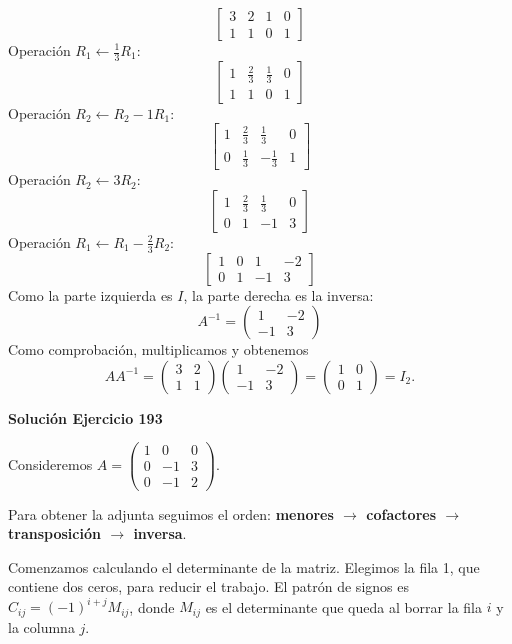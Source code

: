 \[
\left[\begin{array}{rr|rr}3&2&1&0\\1&1&0&1\end{array}\right]
\]
Operación $R_{1}\leftarrow \frac{1}{3}R_{1}$:
\[
\left[\begin{array}{rr|rr}1&\frac{2}{3}&\frac{1}{3}&0\\1&1&0&1\end{array}\right]
\]
Operación $R_{2}\leftarrow R_{2}-1R_{1}$:
\[
\left[\begin{array}{rr|rr}1&\frac{2}{3}&\frac{1}{3}&0\\0&\frac{1}{3}&- \frac{1}{3}&1\end{array}\right]
\]
Operación $R_{2}\leftarrow 3R_{2}$:
\[
\left[\begin{array}{rr|rr}1&\frac{2}{3}&\frac{1}{3}&0\\0&1&-1&3\end{array}\right]
\]
Operación $R_{1}\leftarrow R_{1}-\frac{2}{3}R_{2}$:
\[
\left[\begin{array}{rr|rr}1&0&1&-2\\0&1&-1&3\end{array}\right]
\]
Como la parte izquierda es $I$, la parte derecha es la inversa:
\[
\boxed{A^{-1}=\begin{pmatrix}1&-2\\-1&3\end{pmatrix}}
\]
Como comprobación, multiplicamos y obtenemos
\[
AA^{-1}=\begin{pmatrix}3&2\\1&1\end{pmatrix}\begin{pmatrix}1&-2\\-1&3\end{pmatrix}=\begin{pmatrix}1&0\\0&1\end{pmatrix}=I_{2}.
\]

\par\bigskip\noindent\textbf{Solución Ejercicio 193}\par\nobreak
Consideremos $A=\begin{pmatrix}1&0&0\\0&-1&3\\0&-1&2\end{pmatrix}$.

Para obtener la adjunta seguimos el orden: \textbf{menores $\to$ cofactores $\to$ transposición $\to$ inversa}.

Comenzamos calculando el determinante de la matriz.
Elegimos la fila 1, que contiene dos ceros, para reducir el trabajo. El patrón de signos es $C_{ij}=(-1)^{i+j}M_{ij}$, donde $M_{ij}$ es el determinante que queda al borrar la fila $i$ y la columna $j$.

